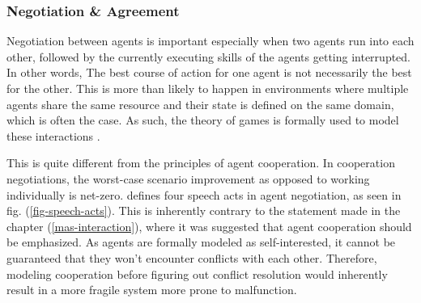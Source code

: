 \documentclass[main.tex]{subfiles}
\begin{document}

\subsubsection{Negotiation \& Agreement}

Negotiation between agents is important especially when two agents run into each other, 
followed by the currently executing skills of the agents getting interrupted. In other words, 
The best course of action for one agent is not necessarily the best for the other. This is more than
likely to happen in environments where multiple agents share the same resource and their state
is defined on the same domain, which is often the case. As such, the theory of games is formally 
used to model these interactions \cite{Binder2022}. 

This is quite different from the principles of agent cooperation. In cooperation negotiations, 
the worst-case scenario improvement as opposed to working individually is net-zero. \cite{Binder2022}
defines four speech acts in agent negotiation, as seen in fig. (\ref{fig-speech-acts}). This is 
inherently contrary to the statement made in the chapter (\ref{mas-interaction}), where it was suggested 
that agent cooperation should be emphasized. As agents are formally modeled as self-interested, 
it cannot be guaranteed that they won't encounter conflicts with each other. Therefore, modeling 
cooperation before figuring out conflict resolution would inherently result in a more fragile system 
more prone to malfunction. 
\end{document}
